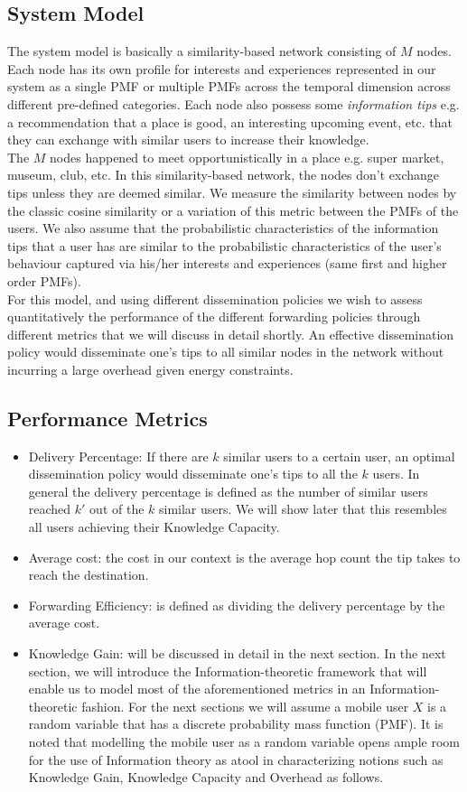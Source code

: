 \documentclass[11pt]{article}
\begin{document}
\subsection{System Model}
The system model is basically a similarity-based network consisting of $M$ nodes. Each node has its own profile for interests and experiences represented in our system as a single PMF or multiple PMFs across the temporal dimension across different pre-defined categories. Each node also possess some \textit{information tips} e.g. a recommendation that a place is good, an interesting upcoming event, etc. that they can exchange with similar users to increase their knowledge.\\
\indent The $M$ nodes happened to meet opportunistically in a place e.g. super market, museum, club, etc. In this similarity-based network, the nodes don't exchange tips unless they are deemed similar. We measure the similarity between nodes by the classic cosine similarity or a variation of this metric between the PMFs of the users. We also assume that the probabilistic characteristics of the information tips that a user has are similar to the probabilistic characteristics of the user's behaviour captured via his/her interests and experiences (same first and higher order PMFs).\\
\indent
For this model, and using different dissemination policies we wish to assess quantitatively the performance of the different forwarding policies through different metrics that we will discuss in detail shortly.
An effective dissemination policy would disseminate one's tips to all similar nodes in the network without incurring a large overhead given energy constraints.
\subsection{Performance Metrics}
\begin{itemize}
\item Delivery Percentage: If there are $k$ similar users to a certain user, an optimal dissemination policy would disseminate one's tips to all the $k$ users. In general the delivery percentage is defined as the number of similar users reached $k\prime$ out of the $k$ similar users. We will show later that this resembles all users achieving their Knowledge Capacity.
\item Average cost: the cost in our context is the average hop count the tip takes to reach the destination.
\item Forwarding Efficiency: is defined as dividing the delivery percentage by the average cost.
\item Knowledge Gain: will be discussed in detail in the next section.
In the next section, we will introduce the Information-theoretic framework that will enable us to model most of the aforementioned metrics in an Information-theoretic fashion. For the next sections we will assume a mobile user $X$ is a random variable that has a discrete probability mass function (PMF). It is noted that modelling the mobile user as a random variable opens ample room for the use of Information theory as atool in characterizing notions such as Knowledge Gain, Knowledge Capacity and Overhead as follows.
\end{itemize}
\end{document}
